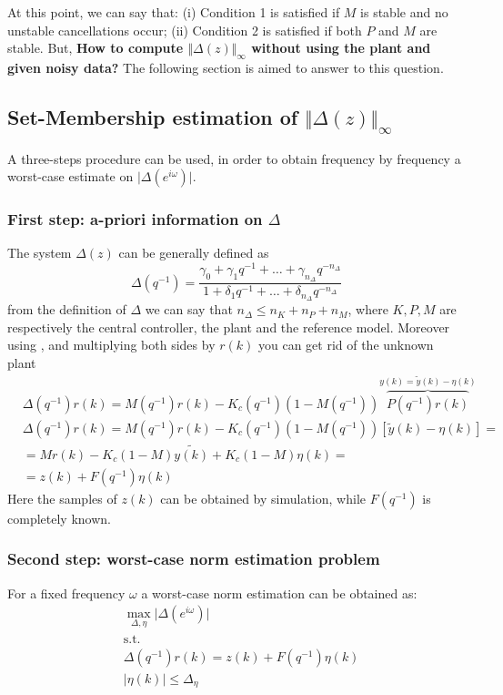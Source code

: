 \noindent
At this point, we can say that: (i) Condition 1 is satisfied if $M$ is stable and no unstable cancellations occur; (ii) Condition 2 is satisfied if both $P$ and $M$ are stable. But, \textbf{How to compute $\Vert \Delta(z) \Vert_\infty$ without using the plant and given noisy data?} The following section is aimed to answer to this question.

\subsection{Set-Membership estimation of $\Vert \Delta(z) \Vert_\infty$}
A three-steps procedure can be used, in order to obtain frequency by frequency a worst-case estimate on $\vert \Delta(e^{i\omega}) \vert$. 

\subsubsection{First step: a-priori information on $\Delta$}
The system $\Delta(z)$ can be generally defined as
\begin{equation}\label{eq:delta_q}
    \Delta(q^{-1}) = \frac{
        \gamma_0 + \gamma_1 q^{-1} + \dots + \gamma_{n_\Delta} q^{-n_{\Delta}}
    }{
        1+\delta_1 q^{-1} + \dots + \delta_{n_{\Delta}} q^{-n_\Delta}
    }
\end{equation}
from the definition of $\Delta$ we can say that $n_\Delta \le n_K + n_P +  n_M$, where $K, P, M$ are respectively the central controller, the plant and the reference model. Moreover using , and multiplying both sides by $r(k)$ you can get rid of the unknown plant
\begin{align}
    &\Delta(q^{-1}) r(k) = M(q^{-1}) r(k) - K_c(q^{-1}) (1-M(q^{-1})) 
    \overbrace{P(q^{-1}) r(k)}^{y(k)=\tilde{y}(k)-\eta(k)}\\
    &\Delta(q^{-1}) r(k) = M(q^{-1}) r(k) - K_c(q^{-1}) (1-M(q^{-1})) 
    {[\tilde{y}(k)-\eta(k)]}=\\
    &=Mr(k)-K_c(1-M)\tilde{y(k)} + K_c(1-M)\eta(k)=\\
    &=z(k) + F(q^{-1}) \eta(k) \label{eq:lastmaxdelta}
\end{align}
Here the samples of $z(k)$ can be obtained by simulation, while $F(q^{-1})$ is completely known.

\subsubsection{Second step: worst-case norm estimation problem}
For a fixed frequency $\omega$ a worst-case norm estimation can be obtained as:
\begin{equation}\label{eq:original_Delta_prob}
    \begin{aligned}
        &\max_{\Delta,\eta} \vert \Delta(e^{i\omega}) \vert\\
        &{\text{s.t.}}\\
        &\Delta(q^{-1})r(k) = z(k) + F(q^{-1})\eta(k)\\
        &\vert \eta(k) \vert \le \Delta_\eta
    \end{aligned}
\end{equation}

